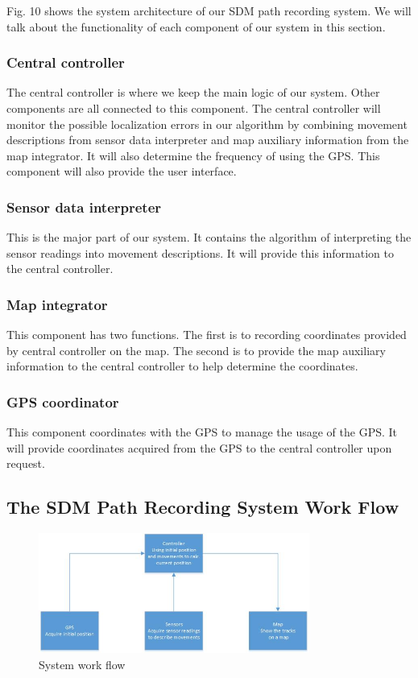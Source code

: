 \documentclass[journal]{IEEEtran}
\begin{document}
Fig. 10 shows the system architecture of our SDM path recording system.
We will talk about the functionality of each component of our system in this section.

\subsubsection{Central controller}
The central controller is where we keep the main logic of our system. 
Other components are all connected to this component. 
The central controller will monitor the possible localization errors in our algorithm by combining movement descriptions from  sensor data interpreter and map auxiliary information from the map integrator.
It will also determine the frequency of using the GPS.
This component will also provide the user interface.

\subsubsection{Sensor data interpreter}
This is the major part of our system. 
It contains the algorithm of interpreting the sensor readings into movement descriptions. 
It will provide this information to the central controller.

\subsubsection{Map integrator}
This component has two functions. 
The first is to recording coordinates provided by central controller on the map.
The second is to provide the map auxiliary information to the central controller to help determine the coordinates.

\subsubsection{GPS coordinator}
This component coordinates with the GPS to manage the usage of the GPS.
It will provide coordinates acquired from the GPS to the central controller upon request.

\subsection{The SDM Path Recording System Work Flow}
\begin{figure}
	\centering
	\includegraphics[width=3.5in]{figures/workflow}
	\caption{System work flow}
\end{figure}
\end{document}
